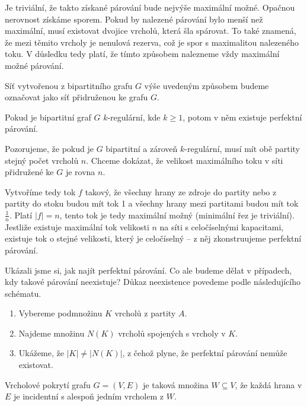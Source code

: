 Je triviální, že takto získané párování bude nejvýše maximální možné. Opačnou nerovnost získáme sporem. Pokud by nalezené párování bylo menší než maximální, musí existovat dvojice vrcholů, která šla spárovat. To také znamená, že mezi těmito vrcholy je nenulová rezerva, což je spor s maximalitou nalezeného toku. V důsledku tedy platí, že tímto způsobem nalezneme vždy maximální možné párování.

\begin{t_definition}
  Síť vytvořenou z bipartitního grafu $G$ výše uvedeným způsobem budeme označovat jako síť přidruženou ke grafu $G$.
\end{t_definition}

\begin{t_claim}
  Pokud je bipartitní graf $G$ $k$-regulární, kde $k\geq 1$, potom v něm existuje perfektní párování.
\end{t_claim}

\begin{t_proof}
  Pozorujeme, že pokud je $G$ bipartitní a zároveň $k$-regulární, musí mít obě partity stejný počet vrcholů $n$. Chceme dokázat, že velikost maximálního toku v síti přidružené ke $G$ je rovna $n$.
  
  Vytvoříme tedy tok $f$ takový, že všechny hrany ze zdroje do partity nebo z partity do stoku budou mít tok 1 a všechny hrany mezi partitami budou mít tok $\frac{1}{n}$. Platí $|f|=n$, tento tok je tedy maximální možný (minimální řez je triviální). Jestliže existuje maximální tok velikosti $n$ na síti s celočíselnými kapacitami, existuje tok o stejné velikosti, který je celočíselný – z něj zkonstruujeme perfektní párování.
\end{t_proof}

Ukázali jsme si, jak najít perfektní párování. Co ale budeme dělat v případech, kdy takové párování neexistuje? Důkaz neexistence povedeme podle následujícího schématu.
\begin{enumerate}
  \item Vybereme podmnožinu $K$ vrcholů z partity $A$.
  \item Najdeme množinu $N(K)$ vrcholů spojených s vrcholy v $K$.
  \item Ukážeme, že $|K|\neq |N(K)|$, z čehož plyne, že perfektní párování nemůže existovat.
\end{enumerate}

\begin{t_definition}
  Vrcholové pokrytí grafu $G=(V,E)$ je taková množina $W\subseteq V$, že každá hrana v $E$ je incidentní s alespoň jedním vrcholem z $W$.
\end{t_definition}

